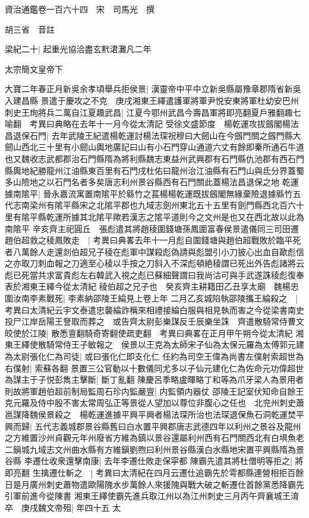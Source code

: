 資治通鑑卷一百六十四　宋　司馬光　撰

胡三省　音註

梁紀二十|{
	起重光協洽盡玄黓涒灘凡二年}


太宗簡文皇帝下

大寶二年春正月新吳余孝頃舉兵拒侯景|{
	漢靈帝中平中立新吳縣屬豫章郡隋省新吳入建昌縣}
景遣于慶攻之不克　庚戌湘東王繹遣護軍將軍尹悦安東將軍杜幼安巴州刺史王珣將兵二萬自江夏趣武昌|{
	江夏今鄂州武昌今壽昌軍將即亮翻夏戶雅翻趣七喻翻　考異曰典略在去年十一月今從太清記}
受徐文盛節度　楊乾運攻拔劔閣楊法昌退保石門|{
	去年武陵王紀遣楊乾運討楊法琛祝穆曰大劒山在今劔門關之劔門縣大劒山西北三十里有小劒山輿地廣記曰山有小石門穿山通道六丈有餘即秦所通石牛道也又魏收志武都郡治石門縣隋為將利縣魏志東益州武興郡有石門縣仇池郡有西石門縣輿地紀勝龍州江油縣東百里有石門戌杜佑曰龍州治江油縣有石門山與氐分界蓋蜀多山險地之以石門名者多矣唐志利州景谷縣西有石門關此蓋楊法昌退保之地}
乾運據南隂平|{
	晉永嘉流寓置南隂平於緜竹之萇楊楊乾運既拔劔閣無緣棄險退據緜竹五代志南梁州有隂平縣宋之北隂平郡也九域志劍州東北五十五里有劍門縣西北百六十里有隂平縣乾運所據其北隂平歟若漢志之隂平道則今之文州是也又在西北故以此為南隂平}
辛亥齊主祀圓丘　張彪遣其將趙稜圍錢塘孫鳳圍富春侯景遣儀同三司田遷趙伯超救之稜鳳敗走　|{
	考異曰典畧去年十一月彪自圍錢塘與趙伯超戰敗於臨平死者八萬餘人走還剡伯超兄子稜在彪軍中謀殺彪偽請與彪盟引小刀披心出血自歃彪信之亦取刀刺血報之刀適至心稜以手按之刀斜入不深彪頓絶稜謂已死出外告彪諸將云彪已死當共求富貴彪左右韓武入視之彪已蘇細聲謂曰我尚沽可與手武遂誅稜彪復奉表於湘東王繹今從太清紀}
稜伯超之兄子也　癸亥齊主耕籍田乙丑享太廟　魏楊忠圍汝南李素戰死|{
	李素納邵陵王綸見上卷上年}
二月乙亥城陷執邵陵攜王綸殺之　|{
	考異曰太清紀云宇文泰遣忠襲綸詐稱來相禮接綸白服與相見執而害之今從梁書南史}
投尸江岸岳陽王詧取而葬之　或告齊太尉彭樂謀反壬辰樂坐誅　齊遣散騎常侍曹文皎使於江陵|{
	散悉亶翻騎奇寄翻使疏吏翻　考異曰典畧在正月甲午朔今從太清紀}
湘東王繹使散騎常侍王子敏報之　侯景以王克為太師宋子仙為太保元羅為太傅郭元建為太尉張化仁為司徒|{
	或曰張化仁即支化仁}
任約為司空王偉為尚書左僕射索超世為右僕射|{
	索蘇各翻}
景置三公官動以十數儀同尤多以子仙元建化仁為佐命元功偉超世為謀主于子悦彭雋主擊斷|{
	斷丁亂翻}
陳慶呂季略盧暉略丁和等為爪牙梁人為景用者則故將軍趙伯超前制局監周石珍内監嚴亶|{
	内監領内器仗}
邵陵王記室伏知命自餘王克元羅及侍中殷不害太常周弘正等景從人望加以尊位非腹心之任也　北兖州刺史蕭邕謀降魏侯景殺之　楊乾運進據平興平興者楊法琛所治也法琛退保魚石洞乾運焚平興而歸|{
	五代志義城郡景谷縣舊曰白水置平興郡唐志武德四年以利州之景谷及龍州之方維置沙州貞觀元年州廢省方維為鎮以景谷還屬利州西有石門關西北有白埧魚老二鎭城九域志文州曲水縣有方維鎭劉煦曰利州景谷縣漢白水縣地宋置平興縣隋為景谷縣}
李遷仕收衆還擊南康|{
	去年李遷仕敗走保寜都}
陳霸先遣其將杜僧明等拒之|{
	將即亮翻}
生擒遷仕斬之　|{
	考異曰太清紀在四月云遷仕追霸先於雩都縣連營相拒百餘日是月廣州刺史蕭物遣歐陽隗水步萬餘人來援隗與戰大破之斬遷仕首餘黨悉降霸先引軍前進今從陳書}
湘東王繹使霸先進兵取江州以為江州刺史三月丙午齊襄城王淯卒　庚戌魏文帝殂|{
	年四十五}
太

